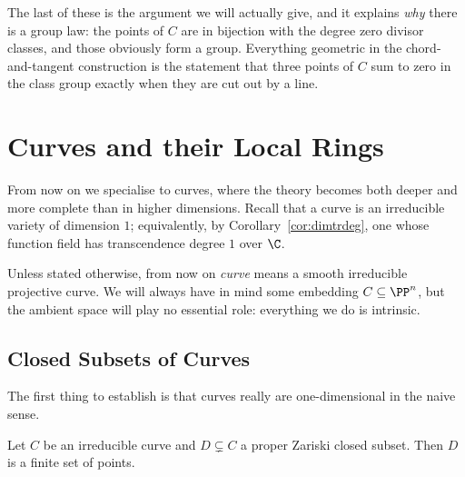 The last of these is the argument we will actually give, and it explains \emph{why} there is a group law: the points of $C$ are in bijection with the degree zero divisor classes, and those obviously form a group. Everything geometric in the chord-and-tangent construction is the statement that three points of $C$ sum to zero in the class group exactly when they are cut out by a line.

\section{Curves and their Local Rings}

From now on we specialise to curves, where the theory becomes both deeper and more complete than in higher dimensions. Recall that a curve is an irreducible variety of dimension $1$; equivalently, by Corollary~\ref{cor:dimtrdeg}, one whose function field has transcendence degree $1$ over $\C$.

\begin{notation}
	Unless stated otherwise, from now on \emph{curve} means a smooth irreducible projective curve. We will always have in mind some embedding $C \subseteq \PP^n$, but the ambient space will play no essential role: everything we do is intrinsic.
\end{notation}

\subsection{Closed Subsets of Curves}

The first thing to establish is that curves really are one-dimensional in the naive sense.

\begin{proposition}\label{prop:closedfinite}
	Let $C$ be an irreducible curve and $D \subsetneq C$ a proper Zariski closed subset. Then $D$ is a finite set of points.
\end{proposition}

